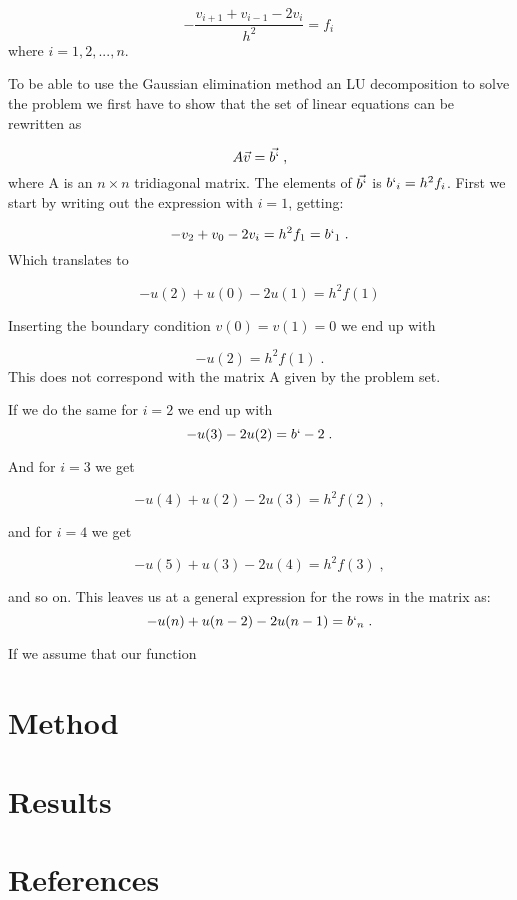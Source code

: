 \documentclass[english,a4paper, 11pt]{article}
\begin{document}
\begin{equation}
-\frac{v_{i+1} + v_{i-1} - 2v_i}{h^2} = f_i \, 
\label{eq5}
\end{equation}
where $i = 1, 2,..., n$.

To be able to use the Gaussian elimination method an LU decomposition to solve the problem we first have to show that the set of linear equations can be rewritten as 

\begin{equation}
A\vec{v} = \vec{b`} \;,
\label{eq6}
\end{equation}
 where A is an $n \times n$ tridiagonal matrix. The elements of $\vec{b`}$ is $b`_i = h^2f_i$. First we start by writing out the expression with $i=1$, getting:
 
 \begin{equation}
 -v_2 + v_0 -2v_i = h^2f_1 = b`_1\;.
 \label{eq7}
 \end{equation}
 Which translates to
 
 \begin{equation}
 -u(2) + u(0) - 2u(1) = h^2f(1)
 \label{eq8}
 \end{equation}
 
Inserting the boundary condition $v(0)= v(1) = 0$ we end up with

\begin{equation}
-u(2) = h^2f(1)\;.
\label{eq9}
\end{equation}
This does not correspond with the matrix A given by the problem set.

 If we do the same for $i=2$ we end up with
 \begin{equation}
 -u(3) -2u(2) = b`-2\;.
 \label{eq10}
 \end{equation}
  
 And for $i = 3$  we get 
 
 \begin{equation}
 -u(4) + u(2) - 2u(3) = h^2f(2)\;,
 \label{eq11}
 \end{equation}
 
 and for $i = 4$ we get
 
 \begin{equation}
 -u(5) + u(3) -2u(4) = h^2f(3)\;,
 \label{eq12}
 \end{equation}
 
 and so on. This leaves us at a general expression for the rows in the matrix as:
 \begin{equation}
 -u(n) + u(n-2) - 2u(n-1) = b`_n\;.
 \label{eq13}
 \end{equation}
 
If we assume that our function
 
 

  




\section{Method}

\section{Results}

\section{References}
\end{document}
